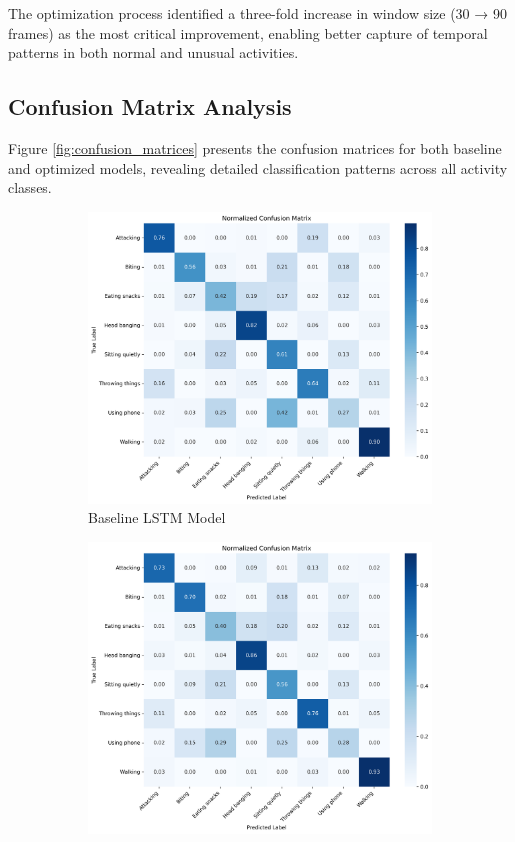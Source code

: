 \documentclass{iopconfser}
\begin{document}
The optimization process identified a three-fold increase in window size (30 → 90 frames) as the most critical improvement, enabling better capture of temporal patterns in both normal and unusual activities.

\subsection{Confusion Matrix Analysis}

Figure \ref{fig:confusion_matrices} presents the confusion matrices for both baseline and optimized models, revealing detailed classification patterns across all activity classes.

\begin{figure}[H]
\centering
\begin{subfigure}{0.48\textwidth}
    \centering
    \includegraphics[width=\textwidth]{results/metrics/baseline/confusion_matrix.png}
    \caption{Baseline LSTM Model}
    \label{fig:baseline_confusion}
\end{subfigure}
\hfill
\begin{subfigure}{0.48\textwidth}
    \centering
    \includegraphics[width=\textwidth]{results/metrics/optimized/confusion_matrix.png}

\end{subfigure}
\end{figure}
\end{document}
